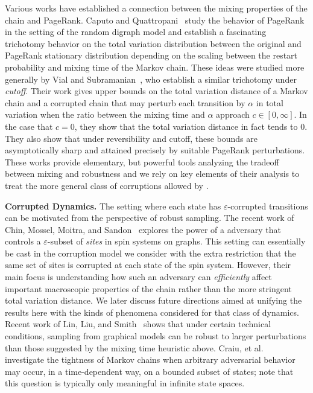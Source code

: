 \documentclass[11pt]{article}
\theoremstyle{remark}
\begin{document}
Various works have established a connection between the mixing properties of the chain and PageRank. Caputo and Quattropani~\cite{caputo} study the behavior of PageRank in the setting of the random digraph model and establish a fascinating trichotomy behavior on the total variation distribution between the original and PageRank stationary distribution depending on the scaling between the restart probability and mixing time of the Markov chain. These ideas were studied more generally by Vial and Subramanian~\cite{subramanian}, who establish a similar trichotomy under \emph{cutoff}. Their work gives upper bounds on the total variation distance of a Markov chain and a corrupted chain that may perturb each transition by $\alpha$ in total variation when the ratio between the mixing time and $\alpha$ approach $c\in [0,\infty]$. In the case that $c=0$, they show that the total variation distance in fact tends to $0$. They also show that under reversibility and cutoff, these bounds are asymptotically sharp and attained precisely by suitable PageRank perturbations. These works provide elementary, but powerful tools analyzing the tradeoff between mixing and robustness and we rely on key elements of their analysis to treat the more general class of corruptions allowed by .

\textbf{Corrupted Dynamics.} The setting where each state has $\varepsilon$-corrupted transitions can be motivated from the perspective of robust sampling. The recent work of Chin, Mossel, Moitra, and Sandon~\cite{adversary} explores the power of a adversary that controls a $\varepsilon$-subset of \emph{sites} in spin systems on graphs. This setting can essentially be cast in the corruption model we consider with the extra restriction that the same set of sites is corrupted at each state of the spin system. However, their main focus is understanding how such an adversary can \emph{efficiently} affect important macroscopic properties of the chain rather than the more stringent total variation distance. We later discuss future directions aimed at unifying the results here with the kinds of phenomena considered for that class of dynamics. Recent work of Lin, Liu, and Smith~\cite{lin2025perturbation} shows that under certain technical conditions, sampling from graphical models can be robust to larger perturbations than those suggested by the mixing time heuristic above. Craiu, et al.~\cite{craiu} investigate the tightness of Markov chains when arbitrary adversarial behavior may occur, in a time-dependent way, on a bounded subset of states; note that this question is typically only meaningful in infinite state spaces.
\end{document}
